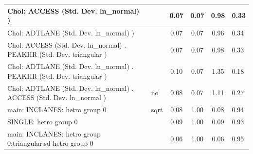 \begin{table}
\begin{center}
\begin{tabular}{|l|l|c|c|c|l|}
			\hline
			 Chol: ACCESS (Std. Dev. ln_normal) ) &  & 0.07 & 0.07 & 0.98 & 0.33 \\
			\hline
			 Chol: ADTLANE (Std. Dev. ln_normal) ) &  & 0.07 & 0.07 & 0.96 & 0.34 \\
			\hline
			 Chol: ACCESS (Std. Dev. ln_normal) . PEAKHR (Std. Dev.   triangular ) &  & 0.07 & 0.07 & 0.98 & 0.33 \\
			\hline
			 Chol: ADTLANE (Std. Dev. ln_normal) . PEAKHR (Std. Dev.   triangular ) &  & 0.10 & 0.07 & 1.35 & 0.18 \\
			\hline
			 Chol: ADTLANE (Std. Dev. ln_normal) . ACCESS (Std. Dev.   ln_normal ) & no & 0.08 & 0.07 & 1.11 & 0.27 \\
			\hline
			main: INCLANES: hetro group 0 & sqrt & 0.08 & 1.00 & 0.08 & 0.94 \\
			\hline
			SINGLE: hetro group 0 &  & 0.09 & 1.00 & 0.09 & 0.93 \\
			\hline
			main: INCLANES: hetro group 0:triangular:sd  hetro group 0 &  & 0.06 & 1.00 & 0.06 & 0.95 \\
			\hline
		\end{tabular}
	\end{center}
\end{table}